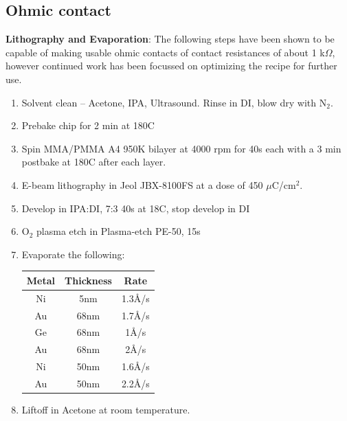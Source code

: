 \subsection{Ohmic contact}

\textbf{Lithography and Evaporation}: The following steps have been shown to be capable of making usable ohmic contacts of contact resistances of about 1 k$\Omega$, however continued work has been focussed on optimizing the recipe for further use. 
\begin{enumerate}
	\item Solvent clean -- Acetone, IPA, Ultrasound. Rinse in DI, blow dry with N$_2$.
	\item Prebake chip for 2 min at 180C
	\item Spin MMA/PMMA A4 950K bilayer at 4000 rpm for 40s each with a 3 min postbake at 180C after each layer.
	\item E-beam lithography in Jeol JBX-8100FS at a dose of 450 $\mu$C/cm$^2$.
	\item Develop in IPA:DI, 7:3 40s at 18C, stop develop in DI
	\item O$_2$ plasma etch in Plasma-etch PE-50, 15s
	\item Evaporate the following:
		\begin{center}
		\begin{tabular}{ |c|c|c| } 
		\hline
		Metal & Thickness & Rate \\ \hline\hline
		Ni & 5nm & 1.3\r{A}/s \\ 
		Au & 68nm & 1.7\r{A}/s \\ 
		Ge & 68nm & 1\r{A}/s \\ 
		Au & 68nm & 2\r{A}/s \\ 
		Ni & 50nm & 1.6\r{A}/s \\ 
		Au & 50nm & 2.2\r{A}/s \\ 
		\hline
		\end{tabular}
		\label{tbl:ohmics}
		\end{center}
	\item Liftoff in Acetone at room temperature.
\end{enumerate}

